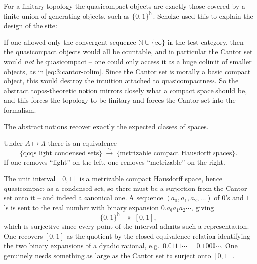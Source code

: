 For a finitary topology the quasicompact objects are exactly those covered by a
finite union of generating objects, such as $\{0,1\}^{\mathbb{N}}$. Scholze used
this to explain the design of the site:

\begin{remark}
\label{rmk:3:need-cantor}
If one allowed only the convergent sequence $\mathbb{N}\cup\{\infty\}$ in the
test category, then the quasicompact objects would all be countable, and in
particular the Cantor set would \emph{not} be quasicompact -- one could only
access it as a huge colimit of smaller objects, as in \eqref{eq:3:cantor-colim}.
Since the Cantor set is morally a basic compact object, this would destroy the
intuition attached to quasicompactness. So the abstract topos-theoretic notion
mirrors closely what a compact space should be, and this forces the topology to
be finitary and forces the Cantor set into the formalism.
\end{remark}

The abstract notions recover exactly the expected classes of spaces.

\begin{proposition}
\label{prop:3:qcqs}
Under $A\mapsto\underline{A}$ there is an equivalence
\begin{equation*}
\{\text{qcqs light condensed sets}\}\ \xrightarrow{\ \sim\ }\
\{\text{metrizable compact Hausdorff spaces}\}.
\end{equation*}
If one removes ``light'' on the left, one removes ``metrizable'' on the right.
\end{proposition}

\begin{example}
\label{ex:3:interval-cantor}
The unit interval $[0,1]$ is a metrizable compact Hausdorff space, hence
quasicompact as a condensed set, so there must be a surjection from the Cantor
set onto it -- and indeed a canonical one. A sequence $(a_0,a_1,a_2,\dots)$ of
$0$'s and $1$'s is sent to the real number with binary expansion
$0.a_0a_1a_2\cdots$, giving
\begin{equation*}
\{0,1\}^{\mathbb{N}}\ \twoheadrightarrow\ [0,1],
\end{equation*}
which is surjective since every point of the interval admits such a
representation. One recovers $[0,1]$ as the quotient by the closed equivalence
relation identifying the two binary expansions of a dyadic rational, e.g.\
$0.0111\cdots=0.1000\cdots$. One genuinely needs something as large as the
Cantor set to surject onto $[0,1]$.
\end{example}

